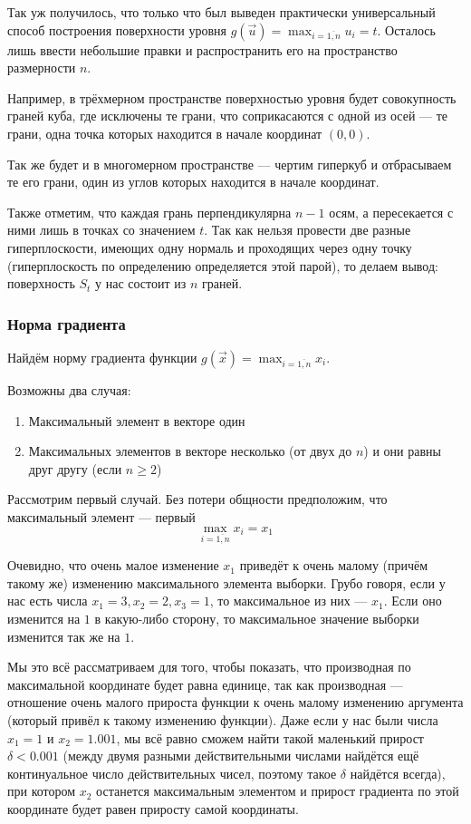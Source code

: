 Так уж получилось, что только что был выведен
практически универсальный способ построения поверхности уровня
$g\left( \vec{u} \right) = \max_{i=\overline{1,n}} u_i = t$.
Осталось лишь ввести небольшие правки и распространить его на
пространство размерности $n$.

Например, в трёхмерном пространстве поверхностью уровня будет
совокупность граней куба, где исключены те грани,
что соприкасаются с одной из осей --- те грани, одна точка которых
находится в начале координат $\left( 0, 0 \right)$.

Так же будет и в многомерном пространстве --- чертим гиперкуб
и отбрасываем те его грани, один из углов которых находится в начале координат.

Также отметим, что каждая грань перпендикулярна $n-1$ осям,
а пересекается с ними лишь в точках со значением $t$.
Так как нельзя провести две разные гиперплоскости, имеющих одну нормаль
и проходящих через одну точку (гиперплоскость по определению
определяется этой парой), то делаем вывод:
поверхность $S_t$ у нас состоит из $n$ граней.

\subsubsection{Норма градиента}
Найдём норму градиента функции
$g\left( \vec{x} \right) = \max_{i=\overline{1,n}} x_i$.

Возможны два случая:
\begin{enumerate}
    \item Максимальный элемент в векторе один
    \item Максимальных элементов в векторе несколько
        (от двух до $n$) и они равны друг другу (если $n \ge 2$)
\end{enumerate}

Рассмотрим первый случай. Без потери общности предположим,
что максимальный элемент --- первый
$$\max_{i=\overline{1,n}} x_i = x_1$$

Очевидно, что очень малое изменение $x_1$ приведёт к
очень малому (причём такому же) изменению максимального элемента выборки.
Грубо говоря, если у нас есть числа $x_1 = 3, x_2 = 2, x_3 = 1$,
то максимальное из них --- $x_1$. Если оно изменится на $1$
в какую-либо сторону, то максимальное значение выборки изменится
так же на $1$.

Мы это всё рассматриваем для того, чтобы показать,
что производная по максимальной координате будет равна единице,
так как производная --- отношение очень малого прироста функции
к очень малому изменению аргумента (который привёл к такому изменению функции).
Даже если у нас были числа $x_1 = 1$ и $x_2 = 1.001$,
мы всё равно сможем найти такой маленький прирост $\delta < 0.001$
(между двумя разными действительными числами найдётся ещё континуальное число
действительных чисел, поэтому такое $\delta$ найдётся всегда),
при котором $x_2$ останется максимальным элементом и прирост градиента
по этой координате будет равен приросту самой координаты.

